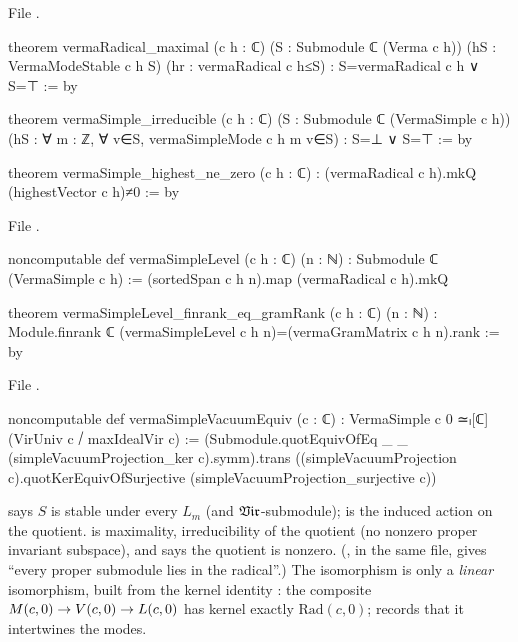File .
\begin{leancode}
theorem vermaRadical_maximal (c h : ℂ) (S : Submodule ℂ (Verma c h))
    (hS : VermaModeStable c h S) (hr : vermaRadical c h≤S) :
    S=vermaRadical c h ∨ S=⊤ := by

theorem vermaSimple_irreducible (c h : ℂ) (S : Submodule ℂ (VermaSimple c h))
    (hS : ∀ m : ℤ, ∀ v∈S, vermaSimpleMode c h m v∈S) : S=⊥ ∨ S=⊤ := by

theorem vermaSimple_highest_ne_zero (c h : ℂ) :
    (vermaRadical c h).mkQ (highestVector c h)≠0 := by
\end{leancode}
File .
\begin{leancode}
noncomputable def vermaSimpleLevel (c h : ℂ) (n : ℕ) : Submodule ℂ (VermaSimple c h) :=
  (sortedSpan c h n).map (vermaRadical c h).mkQ

theorem vermaSimpleLevel_finrank_eq_gramRank (c h : ℂ) (n : ℕ) :
    Module.finrank ℂ (vermaSimpleLevel c h n)=(vermaGramMatrix c h n).rank := by
\end{leancode}
File .
\begin{leancode}
noncomputable def vermaSimpleVacuumEquiv (c : ℂ) :
    VermaSimple c 0 ≃ₗ[ℂ] (VirUniv c ⧸ maxIdealVir c) :=
  (Submodule.quotEquivOfEq _ _ (simpleVacuumProjection_ker c).symm).trans
    ((simpleVacuumProjection c).quotKerEquivOfSurjective (simpleVacuumProjection_surjective c))
\end{leancode}

\begin{dictionary}
 says $S$ is stable under every $L_m$ (and $\mathfrak{Vir}$-submodule);
 is the induced action on the quotient.  is maximality,
\allowbreak{} irreducibility of the quotient (no nonzero proper invariant subspace), and
\allowbreak{}\allowbreak{}\allowbreak{} says the quotient is nonzero. (\allowbreak{}\allowbreak{}\allowbreak{}\allowbreak{},
in the same file, gives ``every proper submodule lies in the radical''.) The isomorphism
 is only a \emph{linear} isomorphism, built from the kernel identity
\allowbreak{}: the composite $M(c,0)\to V(c,0)\to L(c,0)$ has kernel exactly
$\mathrm{Rad}(c,0)$; \allowbreak{} records that it intertwines the modes.
\end{dictionary}

